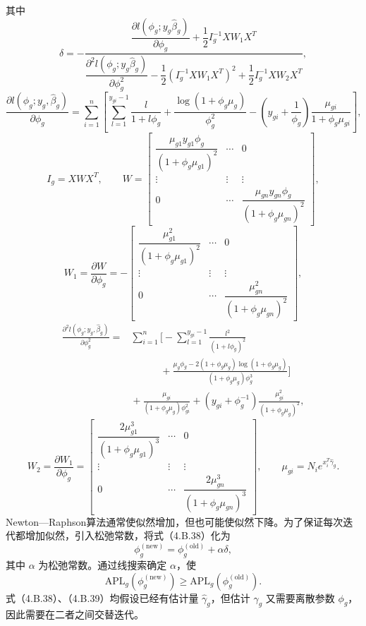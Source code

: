 其中
\[
\delta=-\frac{
\dfrac{\partial l(\phi_g;y_g\widehat\beta_g)}{\partial\phi_g}
+\dfrac12I_g^{-1}XW_1X^T}{
\dfrac{\partial^2l(\phi_g;y_g\widehat\beta_g)}{\partial\phi_g^2}
-\dfrac12(I_g^{-1}XW_1X^T)^2+\dfrac12I_g^{-1}XW_2X^T},
\]
\[
\frac{\partial l(\phi_g;y_g,\widehat\beta_g)}{\partial\phi_g}
=\sum_{i=1}^{n}\left[\sum_{l=1}^{y_{gi}-1}\frac l{1+l\phi_g}
+\frac{\log(1+\phi_g\mu_g)}{\phi_g^2}
-\left(y_{gi}+\frac1{\phi_g}\right)\frac{\mu_{gi}}{1+\phi_g\mu_{gi}}\right],
\]
\[
I_g=XWX^T,\qquad
W=\begin{bmatrix}
\dfrac{\mu_{g1}y_{g1}\phi_g}{(1+\phi_g\mu_{g1})^2}&\cdots&0\\
\vdots&\vdots&\vdots\\
0&\cdots&\dfrac{\mu_{gn}y_{gn}\phi_g}{(1+\phi_g\mu_{gn})^2}
\end{bmatrix},
\]
\[
W_1=\frac{\partial W}{\partial\phi_g}=
-\begin{bmatrix}
\dfrac{\mu_{g1}^2}{(1+\phi_g\mu_{g1})^2}&\cdots&0\\
\vdots&\vdots&\vdots\\
0&\cdots&\dfrac{\mu_{gn}^2}{(1+\phi_g\mu_{gn})^2}
\end{bmatrix},
\]
\[
\begin{aligned}
\frac{\partial^2l(\phi_g;y_g,\widehat\beta_g)}{\partial\phi_g^2}
={}&\sum_{i=1}^{n}\biggl[-\sum_{l=1}^{y_{gi}-1}\frac{l^2}{(1+l\phi_g)^2}\\
&\hspace{3em}{}+\frac{\mu_g\phi_g-2(1+\phi_g\mu_g)\log(1+\phi_g\mu_g)}{
 (1+\phi_g\mu_g)\phi_g^3}\biggr]\\
&{}+\frac{\mu_{gi}}{(1+\phi_g\mu_g)\phi_{gi}^2}
+(y_{gi}+\phi_g^{-1})\frac{\mu_{gi}^2}{(1+\phi_g\mu_g)^2},
\end{aligned}
\]
\[
W_2=\frac{\partial W_1}{\partial\phi_g}=
\begin{bmatrix}
\dfrac{2\mu_{g1}^3}{(1+\phi_g\mu_{g1})^3}&\cdots&0\\
\vdots&\vdots&\vdots\\
0&\cdots&\dfrac{2\mu_{gn}^3}{(1+\phi_g\mu_{gn})^3}
\end{bmatrix},\qquad
\mu_{gi}=N_ie^{x_i^T\widehat\gamma_g}.
\]
Newton—Raphson算法通常使似然增加，但也可能使似然下降。为了保证每次迭代都增加似然，引入松弛常数，将式（4.B.38）化为
\begin{equation}
\phi_g^{(\mathrm{new})}=\phi_g^{(\mathrm{old})}+\alpha\delta,\tag{4.B.39}
\end{equation}
其中 $\alpha$ 为松弛常数。通过线搜索确定 $\alpha$，使
\[
\mathrm{APL}_g(\phi_g^{(\mathrm{new})})\ge\mathrm{APL}_g(\phi_g^{(\mathrm{old})}).
\]
式（4.B.38）、（4.B.39）均假设已经有估计量 $\widehat\gamma_g$，但估计 $\gamma_g$ 又需要离散参数 $\phi_g$，因此需要在二者之间交替迭代。

